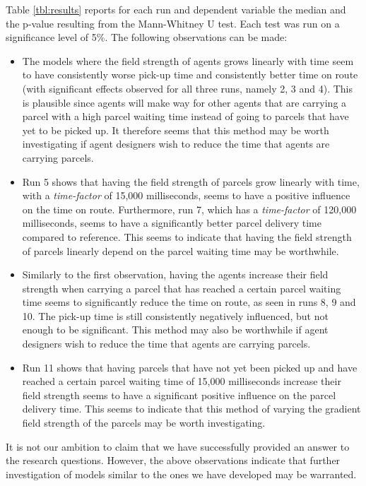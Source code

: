 Table \ref{tbl:results} reports for each run and dependent variable the median and the p-value resulting from the Mann-Whitney U test. Each test was run on a significance level of 5\%. The following observations can be made:
\begin{itemize}
    \item The models where the field strength of agents grows linearly with time seem to have consistently worse pick-up time and consistently better time on route (with significant effects observed for all three runs, namely 2, 3 and 4). This is plausible since agents will make way for other agents that are carrying a parcel with a high parcel waiting time instead of going to parcels that have yet to be picked up. It therefore seems that this method may be worth investigating if agent designers wish to reduce the time that agents are carrying parcels.
    \item Run 5 shows that having the field strength of parcels grow linearly with time, with a \emph{time-factor} of 15,000 milliseconds, seems to have a positive influence on the time on route. Furthermore, run 7, which has a \emph{time-factor} of 120,000 milliseconds, seems to have a significantly better parcel delivery time compared to reference. This seems to indicate that having the field strength of parcels linearly depend on the parcel waiting time may be worthwhile.
    \item Similarly to the first observation, having the agents increase their field strength when carrying a parcel that has reached a certain parcel waiting time seems to significantly reduce the time on route, as seen in runs 8, 9 and 10. The pick-up time is still consistently negatively influenced, but not enough to be significant. This method may also be worthwhile if agent designers wish to reduce the time that agents are carrying parcels.
    \item Run 11 shows that having parcels that have not yet been picked up and have reached a certain parcel waiting time of 15,000 milliseconds increase their field strength seems to have a significant positive influence on the parcel delivery time. This seems to indicate that this method of varying the gradient field strength of the parcels may be worth investigating.
\end{itemize}

It is not our ambition to claim that we have successfully provided an answer to the research questions. However, the above observations indicate that further investigation of models similar to the ones we have developed may be warranted.